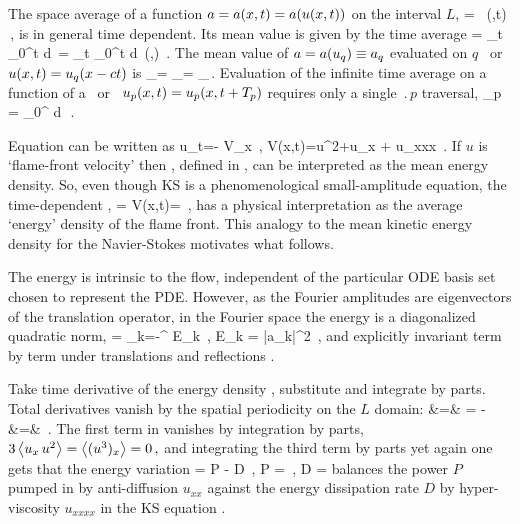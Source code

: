 The {space average} of a function $a = a(x,t) = a(u(x,t))$  on
the interval $L$,
\beq
    \expct{\obser} = \Lint{\pSpace}\, \obser(\pSpace,t)
    \,,
    \label{rpo:spac_ave}
\eeq
is in general time dependent.
Its mean value is given by the {time average}
\beq
\timeAver{\obser}
    =
\lim_{t\rightarrow \infty}  \int_0^t \! d\tau \, \expct{\obser}
    =
\lim_{t\rightarrow \infty}  \int_0^t \!
    \Lint{\tau}  d\pSpace\, \obser(\pSpace,\tau)
    \,.
\label{rpo:tim_ave}
\eeq
The mean value of $a = a(u_q) \equiv a_q$ evaluated on $q$
\eqv\ or {\reqv} $u(x,t) = u_q(x-ct)$ is
\beq
\timeAver{\obser}_\stagn = \expct{\obser}_\stagn = \obser_\stagn\,.
\label{rpo:u-eqv} \eeq Evaluation of the infinite time average
 on a function of a \po\ or \rpo\
$u_p(x,t)=u_p(x,t+{T_{p}})$ requires only a single
$\period{p}$ traversal,
\beq
  \timeAver{\obser}_p = 
    \int_0^{\period{p}} \! d\tau \, \expct{\obser}
\,.
\label{rpo:u-cyc}
\eeq

Equation  can be written as
\beq
    u_t=- V_x
        \,,\qquad
    V(x,t)={\textstyle{}}u^2+u_{x} + u_{xxx}
    \,.
If $u$ is `flame-front velocity' then \expctE, defined in
, can be interpreted as the mean energy
density. So, even though KS is a phenomenological
small-amplitude equation, the time-dependent ,
\beq
    \expctE=
  \Lint{\pSpace}
  V(x,t)=
  \Lint{\pSpace} 
  \,,
  \label{ksEnergy}
\eeq
has a physical interpretation as the average `energy'
density of the flame front. This analogy to the mean kinetic energy
density for the Navier-Stokes motivates what follows.

The energy  is intrinsic to the flow,
independent of the particular ODE basis set chosen to
represent the PDE. However, as the Fourier amplitudes are
eigenvectors of the translation operator, in the Fourier
space the energy is a diagonalized quadratic norm,
\beq
\expctE
          =  \sum_{k=-\infty}^{\infty} E_k
\,,\qquad
E_k =
    {\textstyle{}}|a_k|^2
\,,
and explicitly invariant term by term
under translations
and reflections .

Take time derivative of the energy density ,
substitute  and integrate by parts. Total derivatives vanish
by the spatial periodicity on the $L$ domain:
\bea
   \dot{\expctE} &=&
         = - 
    \continue
    &=&
    \,.
\label{rpo:ksErate}
\eea
The first term in  vanishes by
integration by parts,
\(
3 \left\langle { u_x \, u^2} \right\rangle= \left\langle {(u^3)_x} \right\rangle = 0
\,,
\)
and integrating the third term by parts yet again
one gets that the energy variation
\beq
   \dot{\expctE} = P - D
                \,,\qquad
      P =  
                \,,\quad
      D =  
balances the power $P$ pumped in by anti-diffusion $u_{xx}$
against the energy dissipation rate $D$
by hyper-viscosity $u_{xxxx}$
in the KS equation .

